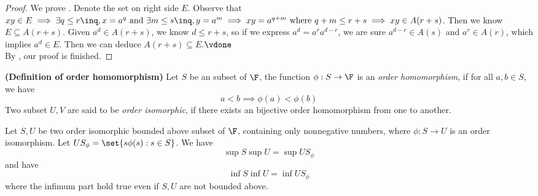 \documentclass{report}
\begin{document}
\begin{proof}  
We prove . Denote the set on right side $E$. Observe that $xy\in E \implies \exists q\leq r\inq,x=a^q\text{ and }\exists m\leq s\inq,y=a^m\implies xy=a^{q+m} \text{ where $q+m\leq r+s$}\implies xy\in A(r+s)$. Then we know $E\subseteq A(r+s)$. Given $a^d\in A(r+s)$, we know $d\leq r+s$, so if we express $a^d=a^ra^{d-r}$, we are sure $a^{d-r}\in A(s)$ and $a^r\in A(r)$, which implies $a^d\in E$. Then we can deduce $A(r+s)\subseteq E$.$\vdone$\\

By , our proof is finished.
\end{proof}
\begin{definition}
\label{1.4.7}
\textbf{(Definition of order homomorphism)} Let $S$ be an subset of  $\F$, the function  $\phi :S \rightarrow  \F $ is an \textit{order homomorphism}, if for all $a,b\in S$, we have 
\begin{equation*}
  a<b\implies \phi (a)<\phi (b)
\end{equation*}
Two subset $U,V$ are said to be  \textit{order isomorphic}, if there exists an bijective order homomorphism from one to another.
\end{definition}
\begin{lemma}
\label{1.4.8}
Let $S,U$ be two order isomorphic bounded above subset of  $\F$, containing only nonnegative numbers, where $\phi :S\rightarrow U$ is an order isomorphism. Let $US_\phi = \set{s\phi (s):s\in S}$. We have
\begin{equation*}
\sup S \sup U= \sup US_\phi 
\end{equation*}
and have
\begin{equation*}
\inf S\inf U=\inf US_\phi 
\end{equation*}
where the infimum part hold true even if $S,U$ are not bounded above.
\end{lemma}
\end{document}
